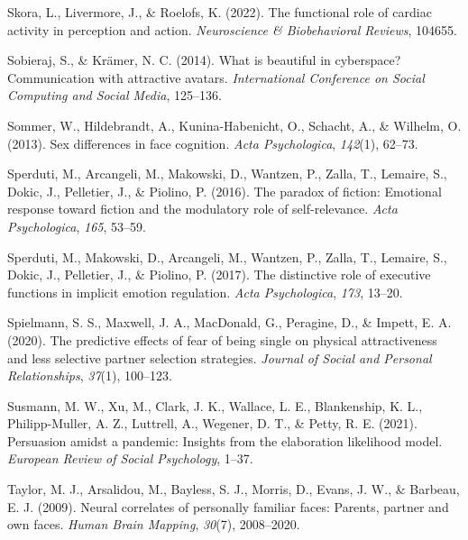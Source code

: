 \documentclass[
  man,mask,floatsintext]{apa6}
\newlength{\cslhangindent}
\newlength{\cslentryspacingunit} %
\newenvironment{CSLReferences}[2] %
 {%
  \setlength{\parindent}{0pt}
  \ifodd #1
  \let\oldpar\par
  \def\par{\hangindent=\cslhangindent\oldpar}
  \fi
  \setlength{\parskip}{#2\cslentryspacingunit}
 }%
 {}
\begin{document}
\begin{CSLReferences}{1}{0}
\leavevmode{}%
Skora, L., Livermore, J., \& Roelofs, K. (2022). The functional role of cardiac activity in perception and action. \emph{Neuroscience \& Biobehavioral Reviews}, 104655.

\leavevmode{}%
Sobieraj, S., \& Krämer, N. C. (2014). What is beautiful in cyberspace? Communication with attractive avatars. \emph{International Conference on Social Computing and Social Media}, 125--136.

\leavevmode{}%
Sommer, W., Hildebrandt, A., Kunina-Habenicht, O., Schacht, A., \& Wilhelm, O. (2013). Sex differences in face cognition. \emph{Acta Psychologica}, \emph{142}(1), 62--73.

\leavevmode{}%
Sperduti, M., Arcangeli, M., Makowski, D., Wantzen, P., Zalla, T., Lemaire, S., Dokic, J., Pelletier, J., \& Piolino, P. (2016). The paradox of fiction: Emotional response toward fiction and the modulatory role of self-relevance. \emph{Acta Psychologica}, \emph{165}, 53--59.

\leavevmode{}%
Sperduti, M., Makowski, D., Arcangeli, M., Wantzen, P., Zalla, T., Lemaire, S., Dokic, J., Pelletier, J., \& Piolino, P. (2017). The distinctive role of executive functions in implicit emotion regulation. \emph{Acta Psychologica}, \emph{173}, 13--20.

\leavevmode{}%
Spielmann, S. S., Maxwell, J. A., MacDonald, G., Peragine, D., \& Impett, E. A. (2020). The predictive effects of fear of being single on physical attractiveness and less selective partner selection strategies. \emph{Journal of Social and Personal Relationships}, \emph{37}(1), 100--123.

\leavevmode{}%
Susmann, M. W., Xu, M., Clark, J. K., Wallace, L. E., Blankenship, K. L., Philipp-Muller, A. Z., Luttrell, A., Wegener, D. T., \& Petty, R. E. (2021). Persuasion amidst a pandemic: Insights from the elaboration likelihood model. \emph{European Review of Social Psychology}, 1--37.

\leavevmode{}%
Taylor, M. J., Arsalidou, M., Bayless, S. J., Morris, D., Evans, J. W., \& Barbeau, E. J. (2009). Neural correlates of personally familiar faces: Parents, partner and own faces. \emph{Human Brain Mapping}, \emph{30}(7), 2008--2020.


\end{CSLReferences}
\end{document}
